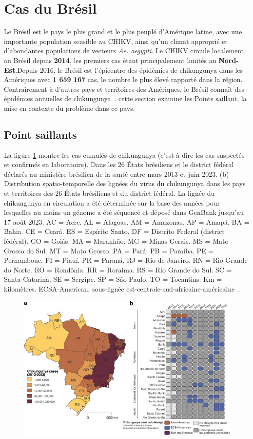 \section{Cas du Brésil}
Le Brésil est le pays le plus grand et le plus peuplé d'Amérique latine, avec une importante population sensible au CHIKV, ainsi qu'un climat approprié et d'abondantes populations de vecteurs \textit{Ae. aegypti}. Le CHIKV circule localement au Brésil depuis \textbf{2014}, les premiers cas étant principalement limités au \textbf{Nord-Est}.Depuis 2016, le Brésil est l'épicentre des épidémies de chikungunya dans les Amériques avec \textbf{1 659 167} cas, le nombre le plus élevé rapporté dans la région. Contrairement à d'autres pays et territoires des Amériques, le Brésil connaît des épidémies annuelles de chikungunya~\cite{DESOUZA2024100673}.
cette section examine les Points saillant, la mise en contexte du problème dans ce pays.
\subsection{Point saillants}
La figure \ref{fig:brazilregionscases} montre les cas cumulés de chikungunya (c'est-à-dire les cas suspectés et confirmés en laboratoire). Dans les 26 États brésiliens et le district fédéral déclarés au ministère brésilien de la santé entre mars 2013 et juin 2023. (b) Distribution spatio-temporelle des lignées du virus du chikungunya dans les pays et territoires des 26 États brésiliens et du district fédéral. La lignée du chikungunya en circulation a été déterminée sur la base des années pour lesquelles au moins un génome a été séquencé et déposé dans GenBank jusqu'au 17 août 2023. AC = Acre. AL = Alagoas. AM = Amazonas. AP = Amapá. BA = Bahia. CE = Ceará. ES = Espírito Santo. DF = Distrito Federal (district fédéral). GO = Goiás. MA = Maranhão. MG = Minas Gerais. MS = Mato Grosso do Sul. MT = Mato Grosso. PA = Pará. PB = Paraíba. PE = Pernambouc. PI = Piauí. PR = Paraná. RJ = Rio de Janeiro. RN = Rio Grande do Norte. RO = Rondônia. RR = Roraima. RS = Rio Grande do Sul. SC = Santa Catarina. SE = Sergipe. SP = São Paulo. TO = Tocantins. Km = kilomètres. ECSA-American, sous-lignée est-centrale-sud-africaine-américaine~\cite{DESOUZA2024100673}.
\begin{figure}[h!]
	\centering
	\includegraphics[width=0.7\linewidth]{images/brazil_regions_cases}
	\caption[Chikungunya Cases brazil]{}
	\label{fig:brazilregionscases}
\end{figure}
